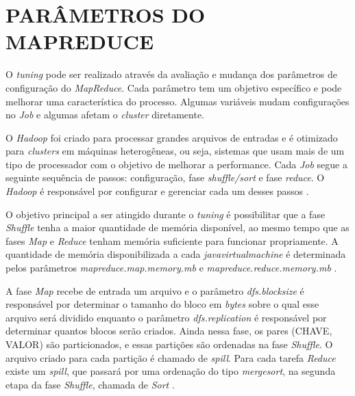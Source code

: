 \section{PARÂMETROS DO MAPREDUCE} \label{sec:parametrosmapreduce}

O \textit{\gls{tuning}} pode ser realizado através da avaliação e mudança dos parâmetros de configuração do \textit{MapReduce}. Cada parâmetro tem um objetivo específico e pode melhorar uma característica do processo. Algumas variáveis mudam configurações no \textit{Job} e algumas afetam o \textit{cluster} diretamente.

O \textit{Hadoop} foi criado para processar grandes arquivos de entradas e é otimizado para \textit{clusters} em máquinas heterogêneas, ou seja, sistemas que usam mais de um tipo de processador com o objetivo de melhorar a performance. Cada \textit{Job} segue a seguinte sequência de passos: configuração, fase \textit{shuffle/sort} e fase \textit{reduce}. O \textit{Hadoop} é responsável por configurar e gerenciar cada um desses passos \cite{ProHadoop09}.



O objetivo principal a ser atingido durante o \textit{\gls{tuning}} é possibilitar que a fase \textit{Shuffle} tenha a maior quantidade de memória disponível, ao mesmo tempo que as fases \textit{Map} e \textit{Reduce} tenham memória suficiente para funcionar propriamente. A quantidade de memória disponibilizada a cada \textit{\gls{javavirtualmachine}} é determinada pelos parâmetros \textit{mapreduce.map.memory.mb} e \textit{mapreduce.reduce.memory.mb} \cite{HadoopBook15}.

A fase \textit{Map} recebe de entrada um arquivo e o parâmetro \textit{dfs.blocksize} é responsável por determinar o tamanho do bloco em \textit{\gls{byte}s} sobre o qual esse arquivo será dividido enquanto o parâmetro \textit{dfs.replication} é responsável por determinar quantos blocos serão criados. Ainda nessa fase, os pares (CHAVE, VALOR) são particionados, e essas partições são ordenadas na fase \textit{Shuffle}. O arquivo criado para cada partição é chamado de \textit{spill}. Para cada tarefa \textit{Reduce} existe um \textit{spill}, que passará por uma ordenação do tipo \textit{\gls{mergesort}}, na segunda etapa da fase \textit{Shuffle}, chamada de \textit{Sort} \cite{ProHadoop09}.

